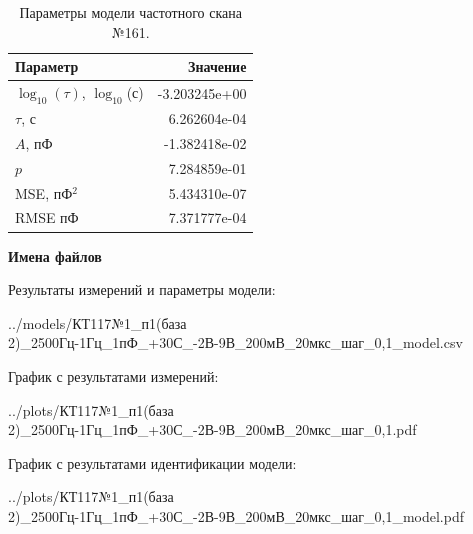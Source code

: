 \begin{table}[!ht]
    \centering
    \caption{Параметры модели частотного скана №161.}
    \begin{tabular}{|l|r|}
        \hline
        Параметр                                       & Значение                  \\ \hline
        $\log_{10}(\tau)$, $\log_{10}$(с)              & -3.203245e+00             \\ \hline
        $\tau$, с                                      & 6.262604e-04              \\ \hline
        $A$, пФ                                        & -1.382418e-02             \\ \hline
        $p$                                            & 7.284859e-01              \\ \hline
        MSE, пФ$^2$                                    & 5.434310e-07              \\ \hline
        RMSE пФ                                        & 7.371777e-04              \\ \hline
    \end{tabular}
    \label{table:frequency_scan_model_161}
\end{table}

\textbf{Имена файлов}

Результаты измерений и параметры модели:

\scriptsize../models/КТ117№1\_п1(база 2)\_2500Гц-1Гц\_1пФ\_+30С\_-2В-9В\_200мВ\_20мкс\_шаг\_0,1\_model.csv
\normalsize

График с результатами измерений:

\scriptsize../plots/КТ117№1\_п1(база 2)\_2500Гц-1Гц\_1пФ\_+30С\_-2В-9В\_200мВ\_20мкс\_шаг\_0,1.pdf
\normalsize

График с результатами идентификации модели:

\scriptsize../plots/КТ117№1\_п1(база 2)\_2500Гц-1Гц\_1пФ\_+30С\_-2В-9В\_200мВ\_20мкс\_шаг\_0,1\_model.pdf
\normalsize

